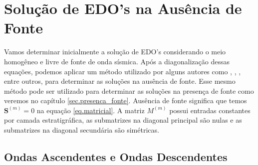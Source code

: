 \section{Solu\c{c}\~ao de EDO's na Aus\^encia de Fonte}\label{sec.ausencia_fonte}

Vamos determinar inicialmente a solu\c{c}\~ao de EDO's  considerando o meio homog\^eneo e livre de fonte de onda s\'ismica. Ap\'os a diagonaliza\c{c}\~ao dessas equa\c{c}\~oes, podemos aplicar um m\'etodo utilizado por alguns autores como \cite{Ursin-1983}, \cite{Azeredo_2013}, \cite{White_Zhou_2006}, \cite{miranda_2016} entre outros, para determinar as solu\c{c}\~oes na aus\^encia de fonte. Esse mesmo m\'etodo pode ser utilizado para determinar as solu\c{c}\~oes na presen\c{c}a de fonte como veremos no cap\'itulo \ref{sec.presenca_fonte}. Aus\^encia de fonte significa que temos $\mathbf{S}^{(m)}=0$ na equa\c{c}\~ao \ref{eq.matricial}. A matriz ${M}^{(m)}$ possui entradas constantes por camada estratigr\'afica, as submatrizes na diagonal principal s\~ao nulas e as submatrizes na diagonal secund\'aria s\~ao sim\'etricas. 

\subsection{Ondas Ascendentes e Ondas Descendentes}

